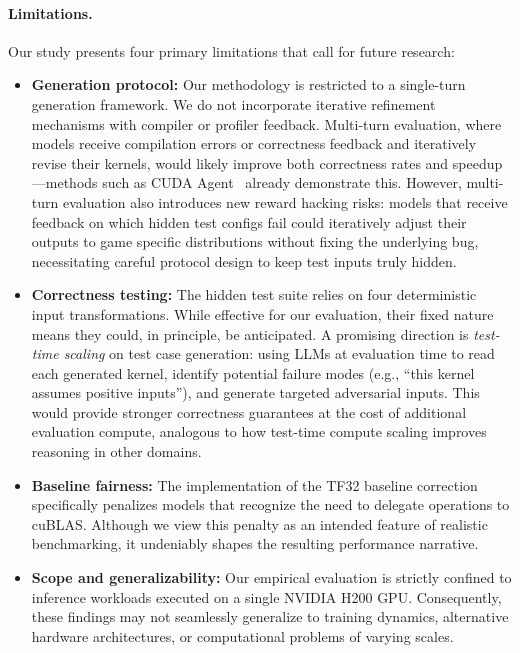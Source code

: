 \documentclass[]{fairmeta}
\begin{document}
\paragraph{Limitations.} Our study presents four primary limitations that call for future research:
\begin{itemize}
    \item \textbf{Generation protocol:} Our methodology is restricted to a single-turn generation framework. We do not incorporate iterative refinement mechanisms with compiler or profiler feedback. Multi-turn evaluation, where models receive compilation errors or correctness feedback and iteratively revise their kernels, would likely improve both correctness rates and speedup---methods such as CUDA Agent~\citep{DBLP:journals/corr/abs-2602-24286} already demonstrate this. However, multi-turn evaluation also introduces new reward hacking risks: models that receive feedback on which hidden test configs fail could iteratively adjust their outputs to game specific distributions without fixing the underlying bug, necessitating careful protocol design to keep test inputs truly hidden.
    \item \textbf{Correctness testing:} The hidden test suite relies on four deterministic input transformations. While effective for our evaluation, their fixed nature means they could, in principle, be anticipated. A promising direction is \emph{test-time scaling} on test case generation: using LLMs at evaluation time to read each generated kernel, identify potential failure modes (e.g., ``this kernel assumes positive inputs''), and generate targeted adversarial inputs. This would provide stronger correctness guarantees at the cost of additional evaluation compute, analogous to how test-time compute scaling improves reasoning in other domains.
    \item \textbf{Baseline fairness:} The implementation of the TF32 baseline correction specifically penalizes models that recognize the need to delegate operations to cuBLAS. Although we view this penalty as an intended feature of realistic benchmarking, it undeniably shapes the resulting performance narrative.
    \item \textbf{Scope and generalizability:} Our empirical evaluation is strictly confined to inference workloads executed on a single NVIDIA H200 GPU. Consequently, these findings may not seamlessly generalize to training dynamics, alternative hardware architectures, or computational problems of varying scales.
\end{itemize}
\end{document}
